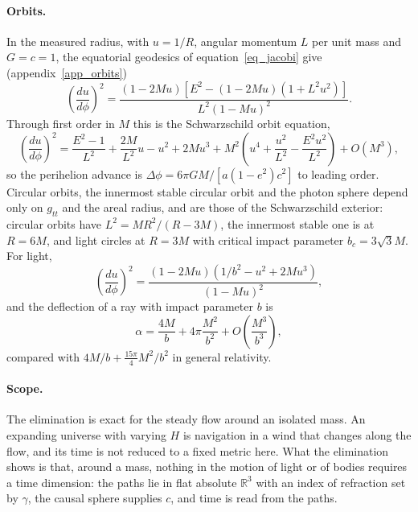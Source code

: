 \documentclass{iopjournal}
\begin{document}
\paragraph{Orbits.} In the measured radius, with $u=1/R$, angular momentum $L$ per unit mass and $G=c=1$, the equatorial geodesics of equation~\eqref{eq_jacobi} give (appendix~\ref{app_orbits})
\begin{equation}\label{eq_jacobi_orbit}
    \left(\frac{du}{d\phi}\right)^2=\frac{(1-2Mu)\left[E^2-(1-2Mu)\left(1+L^2u^2\right)\right]}{L^2\left(1-Mu\right)^2}.
\end{equation}
Through first order in $M$ this is the Schwarzschild orbit equation,
\begin{equation}
    \left(\frac{du}{d\phi}\right)^2=\frac{E^2-1}{L^2}+\frac{2M}{L^2}u-u^2+2Mu^3+M^2\left(u^4+\frac{u^2}{L^2}-\frac{E^2u^2}{L^2}\right)+O(M^3),
\end{equation}
so the perihelion advance is $\Delta\phi=6\pi GM/[a(1-e^2)c^2]$ to leading order. Circular orbits, the innermost stable circular orbit and the photon sphere depend only on $g_{tt}$ and the areal radius, and are those of the Schwarzschild exterior: circular orbits have $L^2=MR^2/(R-3M)$, the innermost stable one is at $R=6M$, and light circles at $R=3M$ with critical impact parameter $b_c=3\sqrt3M$. For light,
\begin{equation}\label{eq_light_orbit}
    \left(\frac{du}{d\phi}\right)^2=\frac{(1-2Mu)\left(1/b^2-u^2+2Mu^3\right)}{(1-Mu)^2},
\end{equation}
and the deflection of a ray with impact parameter $b$ is
\begin{equation}\label{eq_deflection}
    \alpha=\frac{4M}{b}+4\pi\frac{M^2}{b^2}+O\!\left(\frac{M^3}{b^3}\right),
\end{equation}
compared with $4M/b+\tfrac{15\pi}{4}M^2/b^2$ in general relativity.

\paragraph{Scope.} The elimination is exact for the steady flow around an isolated mass. An expanding universe with varying $H$ is navigation in a wind that changes along the flow, and its time is not reduced to a fixed metric here. What the elimination shows is that, around a mass, nothing in the motion of light or of bodies requires a time dimension: the paths lie in flat absolute $\mathbb{R}^3$ with an index of refraction set by $\gamma$, the causal sphere supplies $c$, and time is read from the paths.
\end{document}
